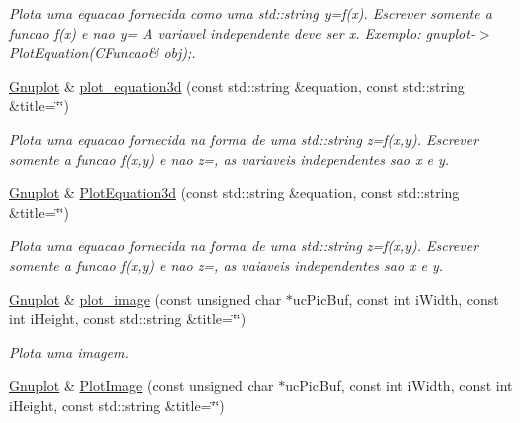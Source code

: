 \begin{DoxyCompactItemize}
\begin{DoxyCompactList}\small\item\em Plota uma equacao fornecida como uma std\-::string y=f(x). Escrever somente a funcao f(x) e nao y= A variavel independente deve ser x. Exemplo\-: gnuplot-\/$>$Plot\-Equation(\-C\-Funcao\& obj);. \end{DoxyCompactList}\item 
\hypertarget{classGnuplot_a79aed3a6927f7d1d3497cba441e8a943}{\hyperlink{classGnuplot}{Gnuplot} \& \hyperlink{classGnuplot_a79aed3a6927f7d1d3497cba441e8a943}{plot\-\_\-equation3d} (const std\-::string \&equation, const std\-::string \&title=\char`\"{}\char`\"{})}\label{classGnuplot_a79aed3a6927f7d1d3497cba441e8a943}

\begin{DoxyCompactList}\small\item\em Plota uma equacao fornecida na forma de uma std\-::string z=f(x,y). Escrever somente a funcao f(x,y) e nao z=, as variaveis independentes sao x e y. \end{DoxyCompactList}\item 
\hypertarget{classGnuplot_a545ea6339c234d277339ab148cd11dba}{\hyperlink{classGnuplot}{Gnuplot} \& \hyperlink{classGnuplot_a545ea6339c234d277339ab148cd11dba}{Plot\-Equation3d} (const std\-::string \&equation, const std\-::string \&title=\char`\"{}\char`\"{})}\label{classGnuplot_a545ea6339c234d277339ab148cd11dba}

\begin{DoxyCompactList}\small\item\em Plota uma equacao fornecida na forma de uma std\-::string z=f(x,y). Escrever somente a funcao f(x,y) e nao z=, as vaiaveis independentes sao x e y. \end{DoxyCompactList}\item 
\hyperlink{classGnuplot}{Gnuplot} \& \hyperlink{classGnuplot_ab71117b8fa74d53ea20c313717d86b5c}{plot\-\_\-image} (const unsigned char $\ast$uc\-Pic\-Buf, const int i\-Width, const int i\-Height, const std\-::string \&title=\char`\"{}\char`\"{})
\begin{DoxyCompactList}\small\item\em Plota uma imagem. \end{DoxyCompactList}\item 
\hypertarget{classGnuplot_aeb28a013344a81314bf831e14623154e}{\hyperlink{classGnuplot}{Gnuplot} \& \hyperlink{classGnuplot_aeb28a013344a81314bf831e14623154e}{Plot\-Image} (const unsigned char $\ast$uc\-Pic\-Buf, const int i\-Width, const int i\-Height, const std\-::string \&title=\char`\"{}\char`\"{})}\label{classGnuplot_aeb28a013344a81314bf831e14623154e}


\end{DoxyCompactItemize}
